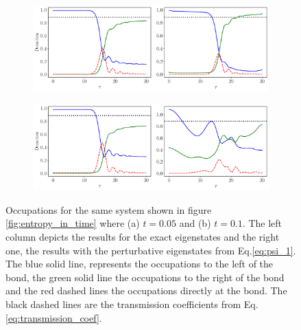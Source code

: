 \documentclass{article}
\begin{document}
\begin{figure}[h]
    \centering
    \begin{subfigure}[b]{0.7\textwidth}
        \includegraphics[width=\textwidth]{figures/report_08_2025/occupations_Lqpc=60_Omega=0.4_t=0.05.pdf}
        \caption{}
    \end{subfigure}
    \vspace{0.001\textwidth}
    \begin{subfigure}[b]{0.7\textwidth}
        \includegraphics[width=\textwidth]{figures/report_08_2025/occupations_Lqpc=60_Omega=0.4_t=0.1.pdf}
        \caption{}
    \end{subfigure}
    \caption{Occupations for the same system shown in figure \ref{fig:entropy_in_time} where (a) $t=0.05$ and (b) $t=0.1$. The left column depicts the results for the exact eigenstates and the right one, the results with the perturbative eigenstates from Eq.\eqref{eq:psi_1}. The blue solid line, represents the occupations to the left of the bond, the green solid line the occupations to the right of the bond and the red dashed lines the occupations directly at the bond. The black dashed lines are the transmission coefficients from Eq.\eqref{eq:transmission_coef}. }
    \label{fig:occupations}
\end{figure}




\end{document}
